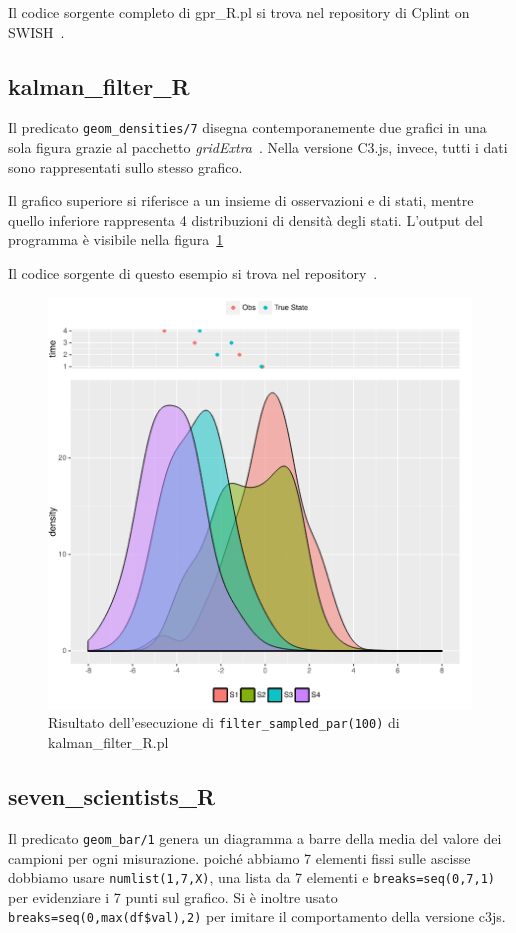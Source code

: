 \documentclass[10pt,titlepage,twoside,a4paper]{report}
\begin{document}
Il codice sorgente completo di gpr\_R.pl si trova nel repository di 
Cplint on SWISH~\cite{gprRpl}.

\subsection{kalman\_filter\_R}
Il predicato \texttt{geom\_densities/7} disegna contemporanemente
due grafici in una sola figura grazie al pacchetto
\emph{gridExtra}~\cite{gridExtra}. Nella versione C3.js, invece, tutti i dati 
sono rappresentati sullo stesso grafico.

Il grafico superiore si riferisce a un insieme di osservazioni e di stati, 
mentre quello inferiore rappresenta 4 distribuzioni di densità degli stati.
L'output del programma è visibile nella figura~\ref{fig:kalmanFilterRResult}

Il codice sorgente di questo esempio si trova nel repository~\cite{kalmanFilterRpl}.

\begin{figure}[H]
\centering
\caption{Risultato dell'esecuzione di \texttt{filter\_sampled\_par(100)} di kalman\_filter\_R.pl}
\label{fig:kalmanFilterRResult}
\includegraphics[width=.5\linewidth]{kalman_filter_R_plot.png}
\end{figure}

\subsection{seven\_scientists\_R}
Il predicato \texttt{geom\_bar/1}  genera un diagramma a barre 
della media del valore dei campioni per ogni misurazione. poiché 
abbiamo 7 elementi fissi sulle ascisse dobbiamo usare \texttt{numlist(1,7,X)}, 
una lista da 7 elementi e \texttt{breaks=seq(0,7,1)} per evidenziare i 7 
punti sul grafico. Si è inoltre usato \texttt{breaks=seq(0,max(df\$val),2)} 
per imitare il comportamento della versione c3js.
\end{document}
